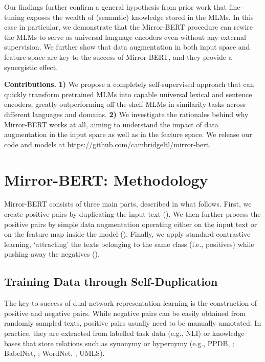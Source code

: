 \documentclass[11pt]{article}
\begin{document}
Our findings further confirm a general hypothesis from prior work \cite{liu2020self,Zaken:2020bitfit,Glavas:2021eacl} that fine-tuning exposes the wealth of (semantic) knowledge stored in the MLMs.
In this case in particular, we demonstrate that the Mirror-BERT procedure can rewire the MLMs to serve as universal language encoders even without any external supervision. We further show that data augmentation in both input space and feature space are key to the success of Mirror-BERT, and they provide a synergistic effect. 


\vspace{1.5mm}
\noindent \textbf{Contributions.} \textbf{1)} We propose a completely self-supervised approach that can quickly transform pretrained MLMs into capable universal lexical and sentence encoders, greatly outperforming off-the-shelf MLMs in similarity tasks across different languages and domains. \textbf{2)} We investigate the rationales behind why Mirror-BERT works at all, aiming to understand the impact of data augmentation in the input space as well as in the feature space. We release our code and models at {\small \url{https://github.com/cambridgeltl/mirror-bert}}.


\section{Mirror-BERT: Methodology}
\label{sec:method}

Mirror-BERT consists of three main parts, described in what follows. First, we create positive pairs by duplicating the input text (). We then further process the positive pairs by simple data augmentation operating either on the input text or on the feature map inside the model (). Finally, we apply standard contrastive learning, `attracting' the texts belonging to the same class (i.e., positives) while pushing away the negatives ().



\subsection{Training Data through Self-Duplication}\label{sec:self-dup}
The key to success of dual-network representation learning \cite[\textit{inter alia}]{Henderson:2019acl,reimers2019sentence,Humeau:2020iclr,liu2020self} is the construction of positive and negative pairs. While negative pairs can be easily obtained from randomly sampled texts, positive pairs usually need to be manually annotated. In practice, they are extracted from labelled task data (e.g., NLI) or knowledge bases that store relations such as synonymy or hypernymy (e.g., PPDB, \citealt{PPDB2}; BabelNet, \citealt{Ehrmann:14}; WordNet, \citealt{Fellbaum:1998wn}; UMLS). 
\end{document}

